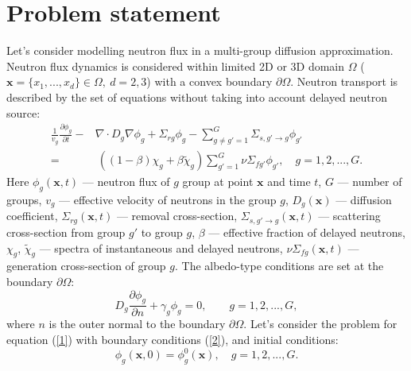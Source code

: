 \documentclass[runningheads,a4paper]{llncs}
\begin{document}
\section{Problem statement}

Let's consider modelling neutron flux in a multi-group diffusion approximation. Neutron flux dynamics is considered within limited 2D or 3D domain  $\Omega$ ($\bm x = \{x_1, ..., x_d\} \in \Omega, \ d = 2,3$) with a convex boundary $\partial \Omega$. Neutron transport is described by the set of equations without taking into account delayed neutron source:
 \begin{equation}\label{1}
\begin{split}
 \frac{1}{v_g} \frac{\partial \phi_g}{\partial t} - & \nabla \cdot D_g \nabla \phi_g + \Sigma_{rg} \phi_g 
 - \sum_{g\neq g'=1}^{G} \Sigma_{s,g'\rightarrow g} \phi_{g'} \\
 =  & \ ( (1-\beta) \chi_g + \beta \widetilde{\chi}_g) \sum_{g'=1}^{G} \nu \Sigma_{fg'} \phi_{g'} , \quad 
 g = 1,2, ..., G .
\end{split}
\end{equation} 
Here $\phi_g(\bm x,t)$ --- neutron flux of $g$ group at point $\bm x$ and time $t$,
$G$ --- number of groups,
$v_g$ --- effective velocity of neutrons in the group $g$,
$D_g(\bm x)$ --- diffusion coefficient, $\Sigma_{rg}(\bm x,t)$ --- removal cross-section,
$\Sigma_{s,g'\rightarrow g}(\bm x,t)$ --- scattering cross-section from group $g'$ to group $g$,
$\beta$ --- effective fraction of delayed neutrons, $\chi_g$, $\widetilde{\chi}_g$  --- spectra of instantaneous and delayed neutrons, 
$\nu\Sigma_{fg}(\bm x,t)$ --- generation cross-section of group $g$.
The albedo-type conditions are set at the boundary $\partial \Omega$:
\begin{equation}\label{2}
 D_g\frac{\partial \phi_g}{\partial n} + \gamma_g \phi_g = 0, \quad 
 \quad g = 1,2, ..., G ,
\end{equation}
where $n$ is the outer normal to the boundary $\partial \Omega$.
Let's consider the problem for equation (\ref{1}) with boundary conditions (\ref{2}), and initial conditions:
\begin{equation}\label{3}
 \phi_g(\bm x,0) = \phi_g^0(\bm x), 
  \quad  g = 1,2, ..., G .
\end{equation} 
\end{document}
